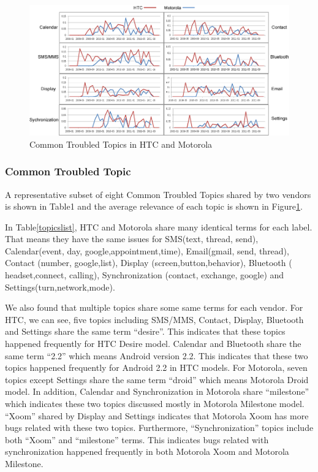 \documentclass[10pt, conference, compsocconf]{IEEEtran}
\begin{document}
\begin{figure}[htb]
\centering
\includegraphics[width=1\textwidth]{commontopic.png}
\caption{Common Troubled Topics in HTC and Motorola}
\label{commontopic}
\end{figure}

\subsubsection{Common Troubled Topic} 

A representative subset of eight Common Troubled Topics shared by two vendors is shown in Table1 and the average relevance of each topic is shown in Figure\ref{commontopic}. 

In Table\ref{topicslist}, HTC and Motorola share many identical terms for each label. That means they have the same issues for SMS(text, thread, send), Calendar(event, day, google,appointment,time), Email(gmail, send, thread), Contact (number, google,list), Display (screen,button,behavior), Bluetooth ( headset,connect, calling), Synchronization (contact, exchange, google) and Settings(turn,network,mode). 

We also found that multiple topics share some same terms for each vendor. For HTC, we can see, five topics including SMS/MMS, Contact, Display, Bluetooth and Settings share the same term “desire”. This indicates that these topics happened frequently for HTC Desire model. Calendar and Bluetooth share the same term “2.2” which means Android version 2.2. This indicates that these two topics happened frequently for Android 2.2 in HTC models. For Motorola, seven topics except Settings share the same term “droid” which means Motorola Droid model. In addition, Calendar and Synchronization in Motorola share “milestone” which indicates these two topics discussed mostly in Motorola Milestone model. “Xoom” shared by Display and Settings indicates that Motorola Xoom has more bugs related with these two topics. Furthermore, “Synchronization” topics include both “Xoom” and “milestone” terms. This indicates bugs related with synchronization happened frequently in both Motorola Xoom and Motorola Milestone. 
\end{document}
